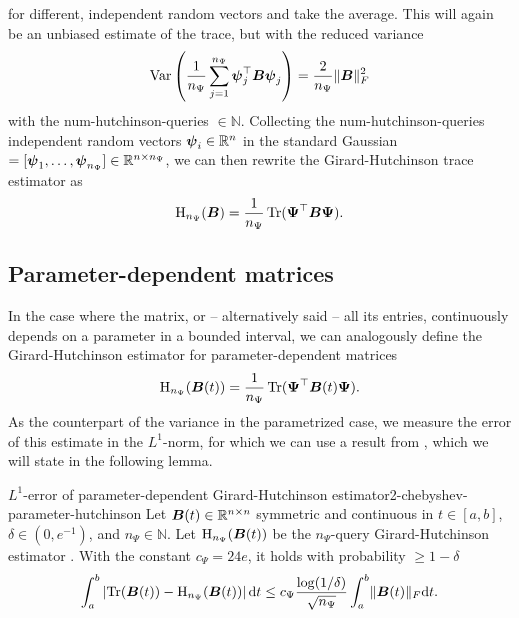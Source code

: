 for different, independent random vectors and take the average. This will again
be an unbiased estimate of the trace, but with the reduced variance
\begin{equation}
    \operatorname{Var}\left( \frac{1}{n_{\Psi}} \sum_{j=1}^{n_{\Psi}}\boldsymbol{\psi}_j^{\top} \boldsymbol{B} \boldsymbol{\psi}_j\right) = \frac{2}{n_{\Psi}} \lVert \boldsymbol{B} \rVert _F^2
    \label{equ:2-chebyshev-hutchinson-mse}
\end{equation}
with the \gls{num-hutchinson-queries} $\in \mathbb{N}$.
Collecting the \gls{num-hutchinson-queries} independent random vectors
$\boldsymbol{\psi}_i \in \mathbb{R}^{n}$ in the standard Gaussian
 $= [\boldsymbol{\psi}_1, \dots, \boldsymbol{\psi}_{n_{\Psi}}] \in \mathbb{R}^{n \times n_{\Psi}}$,
we can then rewrite the Girard-Hutchinson trace estimator as
\begin{equation}
    \operatorname{H}_{n_{\Psi}}(\boldsymbol{B}) = \frac{1}{n_{\Psi}} \operatorname{Tr}(\boldsymbol{\Psi}^{\top} \boldsymbol{B} \boldsymbol{\Psi}).
    \label{equ:2-chebyshev-DGC-hutchionson-estimator}
\end{equation}


\subsection{Parameter-dependent matrices}
\label{subsec:2-chebyshev-trace-parametrized}

In the case where the matrix, or -- alternatively said -- all its entries, continuously depends on a
parameter in a bounded interval, we can analogously define the Girard-Hutchinson
estimator for parameter-dependent matrices
\begin{equation}
    \operatorname{H}_{n_{\Psi}}(\boldsymbol{B}(t)) = \frac{1}{n_{\Psi}} \operatorname{Tr}(\boldsymbol{\Psi}^{\top} \boldsymbol{B}(t) \boldsymbol{\Psi}).
    \label{equ:2-chebyshev-DGC-hutchionson-estimator-parameter}
\end{equation}
As the counterpart of the variance in the parametrized case, we measure the
error of this estimate in the $L^1$-norm, for which we can use a result
from \cite{he2023parameter}, which we will state in the following lemma.
\begin{lemma}{$L^1$-error of parameter-dependent Girard-Hutchinson estimator}{2-chebyshev-parameter-hutchinson}
    Let $\boldsymbol{B}(t) \in \mathbb{R}^{n \times n}$ symmetric and continuous in
    $t \in [a, b]$, $\delta \in (0, e^{-1})$, and $n_{\Psi} \in \mathbb{N}$.
    Let $\operatorname{H}_{n_{\Psi}}(\boldsymbol{B}(t))$ be the $n_{\Psi}$-query
    Girard-Hutchinson estimator .
    With the constant $c_{\Psi} = 24e$, it holds with probability $\geq 1 - \delta$
    \begin{equation}
        \int_{a}^{b} \left| \operatorname{Tr}(\boldsymbol{B}(t)) - \operatorname{H}_{n_{\Psi}}(\boldsymbol{B}(t)) \right| \mathrm{d}t \leq c_{\Psi} \frac{\log(1/\delta)}{\sqrt{n_{\Psi}}} \int_{a}^{b} \lVert \boldsymbol{B}(t) \rVert _F \mathrm{d}t.
    \end{equation}
\end{lemma}

